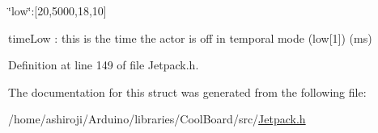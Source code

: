 \char`\"{}low\char`\"{}\+:\mbox{[}20,5000,18,10\mbox{]}

time\+Low \+: this is the time the actor is off in temporal mode (low\mbox{[}1\mbox{]}) (ms) 

Definition at line 149 of file Jetpack.\+h.



The documentation for this struct was generated from the following file\+:\begin{DoxyCompactItemize}
\item 
/home/ashiroji/\+Arduino/libraries/\+Cool\+Board/src/\hyperlink{_jetpack_8h}{Jetpack.\+h}\end{DoxyCompactItemize}
